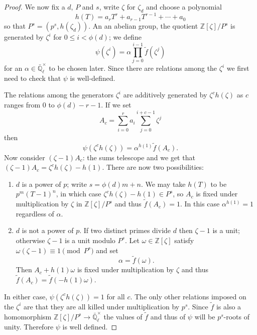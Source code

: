 \documentclass[11pt]{amsart}
\theoremstyle{plain}
\theoremstyle{definition}
\theoremstyle{remark}
\newcommand{\ZZ}{{\mathbb{Z}}}
\newcommand{\EE}{\mathbb{\bar Q}_\ell}
\newcommand{\EEx}{\EE^\times}
\begin{document}
\begin{proof}
  We now fix a $d$, $P$ and $s$, write $\zeta$ for $\zeta_d$ and
  choose a polynomial
  $$h(T) = a_rT^r + a_{r-1}T^{r-1} + \cdots + a_0$$
  so that $P^s = (p^s, h(\zeta_d))$.
  An an abelian group, the quotient $\ZZ[\zeta] / P^s$ is generated by
  $\zeta^i$ for $0 \le i < \phi(d)$; we define
  \begin{equation} \label{eq:psi-def}
    \psi(\zeta^i) = \alpha \prod_{j=0}^{i-1} \tilde{f}(\zeta^j)
  \end{equation}
  for an $\alpha \in \EEx$ to be chosen later.  Since there are
  relations among the $\zeta^i$ we first need to check that $\psi$ is
  well-defined.

  The relations among the generators $\zeta^i$ are additively
  generated by $\zeta^ch(\zeta)$ as $c$ ranges from $0$ to
  $\phi(d)-r-1$.  If we set
  $$A_c = \sum_{i=0}^r a_i \sum_{j=0}^{i+c-1} \zeta^j$$
  then
  $$\psi(\zeta^ch(\zeta)) = \alpha^{h(1)} \tilde{f}(A_c).$$
  Now consider $(\zeta - 1)A_c$: the sums telescope and we get that
  $(\zeta-1)A_c = \zeta^ch(\zeta) - h(1).$ There are now two
  possibilities:
  \begin{enumerate}
  \item $d$ is a power of $p$; write $s = \phi(d)m + n$.  We may take
    $h(T)$ to be $p^m(T-1)^n$, in which case $\zeta^ch(\zeta) - h(1) \in P^s$,
    so $A_c$ is fixed under multiplication by $\zeta$ in
    $\ZZ[\zeta]/P^s$ and thus $\tilde{f}(A_c) = 1$.  In this case
    $\alpha^{h(1)} = 1$ regardless of $\alpha$.
  \item $d$ is not a power of $p$.  If two distinct primes divide $d$
    then $\zeta - 1$ is a unit; otherwise $\zeta - 1$ is a unit modulo
    $P^s$.  Let $\omega \in \ZZ[\zeta]$ satisfy
    $\omega(\zeta - 1) \equiv 1 \pmod{P^s}$ and set
    \begin{equation} \label{alpha-def}
      \alpha = \tilde{f}(\omega).
    \end{equation}
    Then $A_c + h(1)\omega$ is fixed under multiplication by $\zeta$
    and thus $\tilde{f}(A_c) = \tilde{f}(-h(1)\omega)$.
  \end{enumerate}
  In either case, $\psi(\zeta^ch(\zeta)) = 1$ for all $c$.  The only
  other relations imposed on the $\zeta^i$ are that they are all
  killed under multiplication by $p^s$.  Since $\tilde{f}$ is also a
  homomorphism $\ZZ[\zeta]/P^s \rightarrow \EEx$ the values of
  $\tilde{f}$ and thus of $\psi$ will be $p^s$-roots of unity.
  Therefore $\psi$ is well defined.


\end{proof}
\end{document}
